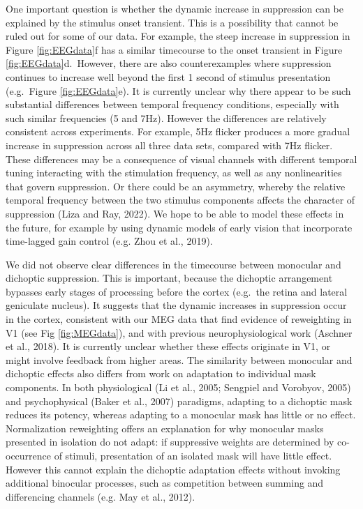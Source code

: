 \documentclass[
]{article}
\begin{document}
One important question is whether the dynamic increase in suppression can be explained by the stimulus onset transient. This is a possibility that cannot be ruled out for some of our data. For example, the steep increase in suppression in Figure \ref{fig:EEGdata}f has a similar timecourse to the onset transient in Figure \ref{fig:EEGdata}d.~However, there are also counterexamples where suppression continues to increase well beyond the first 1 second of stimulus presentation (e.g.~Figure \ref{fig:EEGdata}e). It is currently unclear why there appear to be such substantial differences between temporal frequency conditions, especially with such similar frequencies (5 and 7Hz). However the differences are relatively consistent across experiments. For example, 5Hz flicker produces a more gradual increase in suppression across all three data sets, compared with 7Hz flicker. These differences may be a consequence of visual channels with different temporal tuning interacting with the stimulation frequency, as well as any nonlinearities that govern suppression. Or there could be an asymmetry, whereby the relative temporal frequency between the two stimulus components affects the character of suppression (Liza and Ray, 2022). We hope to be able to model these effects in the future, for example by using dynamic models of early vision that incorporate time-lagged gain control (e.g. Zhou et al., 2019).

We did not observe clear differences in the timecourse between monocular and dichoptic suppression. This is important, because the dichoptic arrangement bypasses early stages of processing before the cortex (e.g.~the retina and lateral geniculate nucleus). It suggests that the dynamic increases in suppression occur in the cortex, consistent with our MEG data that find evidence of reweighting in V1 (see Fig \ref{fig:MEGdata}), and with previous neurophysiological work (Aschner et al., 2018). It is currently unclear whether these effects originate in V1, or might involve feedback from higher areas. The similarity between monocular and dichoptic effects also differs from work on adaptation to individual mask components. In both physiological (Li et al., 2005; Sengpiel and Vorobyov, 2005) and psychophysical (Baker et al., 2007) paradigms, adapting to a dichoptic mask reduces its potency, whereas adapting to a monocular mask has little or no effect. Normalization reweighting offers an explanation for why monocular masks presented in isolation do not adapt: if suppressive weights are determined by co-occurrence of stimuli, presentation of an isolated mask will have little effect. However this cannot explain the dichoptic adaptation effects without invoking additional binocular processes, such as competition between summing and differencing channels (e.g. May et al., 2012).
\end{document}
